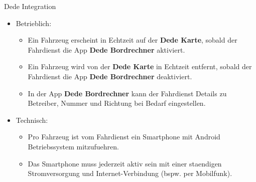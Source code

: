 
\begin{frame}{Dede Integration}
  \begin{itemize}
  \item Betrieblich:
    \begin{itemize}
    \item Ein Fahrzeug erscheint in Echtzeit auf der \textbf{Dede Karte}, sobald der Fahrdienst die App \textbf{Dede Bordrechner} aktiviert.
    \item Ein Fahrzeug wird von der \textbf{Dede Karte} in Echtzeit entfernt, sobald der Fahrdienst die App \textbf{Dede Bordrechner} deaktiviert.
      \item In der App \textbf{Dede Bordrechner} kann der Fahrdienst Details zu Betreiber, Nummer und Richtung bei Bedarf eingestellen.
    \end{itemize}
  \item Technisch:
    \begin{itemize}
    \item Pro Fahrzeug ist vom Fahrdienst ein Smartphone mit Android Betriebssystem mitzufuehren.
    \item Das Smartphone muss jederzeit aktiv sein mit einer staendigen Stromversorgung und Internet-Verbindung (bspw. per Mobilfunk).
    \end{itemize}
  \end{itemize}
\end{frame}
